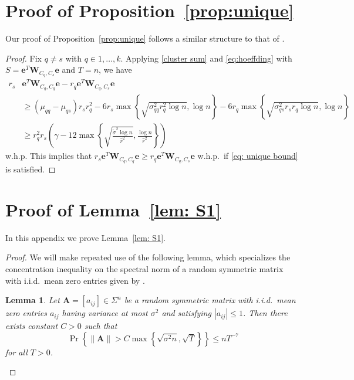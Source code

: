 \documentclass[twoside,11pt]{article}
\newtheorem{lemma}{Lemma}[section]
\DeclareMathOperator{\pr}{Pr}
\newcommand{\e}{\bs {e}}
\newcommand{\bs}{\boldsymbol}
\newcommand{\W}{\bs {W}}
\newcommand{\0}{\bs{0}}
\newcommand{\rbra}[1]{\ensuremath{\left( #1 \right)}} %
\newcommand{\bra}[1]{\ensuremath{\left\{ #1 \right\}}} %
\newcommand{\eq}[1]{\(#1\)}
\begin{document}
{\section{Proof of Proposition~\ref{prop:unique}}
\label{A_unique}



Our proof of Proposition~\ref{prop:unique} follows a similar structure to that of \citet[Lemma~4.4]{ames2014guaranteed}.

\begin{proof}
	Fix \eq{q \neq s} with \eq{q \in 1, \dots, k}.
	Applying \eqref{cluster sum} and \eqref{eq:hoeffding}
	with $S = \e^T \W_{C_q, C_s} \e$ and $T = n$,
	we have
	\begin{align*}
		r_s &\e^T \W_{C_q, C_q} \e
		- r_q \e^T \W_{C_q, C_s} \e \\
		& \ge (\mu_{qq} - \mu_{qs}) r_s r_q^2
		- 6 r_s \max \bra{ \sqrt{ \sigma_{qq}^2 r_q^2 \log n}, \log n}
		- 6 r_q \max \bra{ \sqrt{\sigma_{qs}^2 r_s r_q \log n}, \log n} \\
		&\ge r_q^2 r_s \rbra{ \gamma - 12 \max \bra{ \sqrt{\frac{\tilde\sigma^2 \log n}{\hat r^2}}, \frac{\log n}{\hat r^2}} }
	\end{align*}
	w.h.p.
	This implies that $r_s \e^T \W_{C_q, C_q} \e \ge r_q \e^T \W_{C_q, C_s} \e$ w.h.p.~if \eqref{eq: unique bound} is satisfied.
\end{proof}




\section{Proof of  Lemma~\ref{lem: S1}} %
\label{A_S1_bound}

In this appendix we prove Lemma~\ref{lem: S1}.
\begin{proof}
We will make repeated use of the following
lemma, which specializes the concentration inequality on the spectral norm
of a random symmetric matrix with i.i.d.~mean zero entries given by \citet[Corollary 3.12]{bandeira2016sharp}.

\begin{lemma} \label{lem: tropp tech}
	Let $\bs{A} = [a_{ij}] \in \Sigma^n$ be a random symmetric matrix with i.i.d.~mean zero entries $a_{ij}$ having variance at most
	$\sigma^2$ and satisfying $|a_{ij}| \leq 1$. Then there exists constant $C> 0$ such that
	\begin{equation} \label{eq:sparse_lemma}
	\pr \left\lbrace \|\bs{A}\| > C \max\left\lbrace \sqrt{ \sigma^2 n}, \sqrt{T} \right\rbrace \right\rbrace \leq nT^{-7}
	\end{equation}
	for all $T > 0$.
\end{lemma}


\end{proof}}
\end{document}
